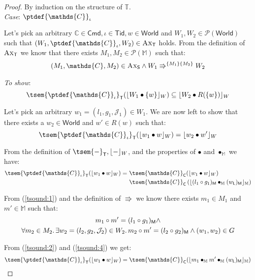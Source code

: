 {\parindent0pt
\begin{proof}
By induction on the structure of $\mathds{T}$. \\	

\textit{Case}: $\ptdef{\mathds{C}}_\iota$

Let's pick an arbitrary $\mathds{C} \in \mathsf{Cmd}, \iota \in \mathsf{Tid}, w \in \mathsf{World}$ and $W_1, W_2 \in \mathcal{P}(\mathsf{World})$ such that $(W_1, \ptdef{\mathds{C}}_\iota, W_2) \in \textsc{Ax}_\mathsf{T}$ holds. From the definition of $\textsc{Ax}_\mathsf{T}$ we know that there exists $M_1, M_2 \in \mathcal{P}(\mathbb{M})$ such that:
\begin{gather}\label{tsound:1}
	(M_1, \mathds{C}, M_2) \in \textsc{Ax}_\mathsf{S} \land W_1 \Rrightarrow^{\{M_1\}\{M_2\}} W_2
\end{gather}

\textit{To show}:
\[
	\tsem{\ptdef{\mathds{C}}_\iota}_\mathsf{T}(\lfloor W_1 \bullet \{w\} \rfloor_W) \subseteq \lfloor W_2 \bullet R(\{w\}) \rfloor_W
\]

Let's pick an arbitrary $w_1 = (l_1, g_1, \mathcal{J}_1) \in W_1$. We are now left to show that there exists a $w_2 \in \mathsf{World}$ and $w' \in R(w)$ such that:
\[
	\tsem{\ptdef{\mathds{C}}_\iota}_\mathsf{T}(\lfloor w_1 \bullet w \rfloor_W) = \lfloor w_2 \bullet w' \rfloor_W
\]

From the definition of $\tsem{-}_\mathsf{T}, \lfloor - \rfloor_W$, and the properties of $\bullet$ and $\bullet_\mathbb{M}$ we have:
\begin{align}\label{tsound:2}
\tsem{\ptdef{\mathds{C}}_\iota}_\mathsf{T}(\lfloor w_1 \bullet w \rfloor_W) =\
&\tsem{\mathds{C}}_\mathsf{C}(\lfloor w_1 \bullet w \rfloor_W) \\
&\tsem{\mathds{C}}_\mathsf{C}\left( \lfloor (l_1 \circ g_1)_\mathsf{M} \bullet_\mathbb{M} (w_\mathsf{L})_\mathsf{M} \rfloor_\mathbb{M} \right)
\end{align}

From (\ref{tsound:1}) and the definition of $\Rrightarrow$ we know there exists $m_1 \in M_1$ and $m' \in \mathbb{M}$ such that:
\begin{gather}
\label{tsound:3} m_1 \circ m' = (l_1 \circ g_1)_\mathsf{M} \land \\
\label{tsound:4} \forall m_2 \in M_2 \ldotp \exists w_2 = (l_2, g_2, \mathcal{J}_2) \in W_2 \ldotp m_2 \circ m' = (l_2 \circ g_2)_\mathsf{M} \land (w_1, w_2) \in G
\end{gather}

From (\ref{tsound:2}) and (\ref{tsound:4}) we get:
\begin{gather}\label{tsound:5}
\tsem{\ptdef{\mathds{C}}_\iota}_\mathsf{T}(\lfloor w_1 \bullet w \rfloor_W) =
\tsem{\mathds{C}}_\mathsf{C}(\lfloor m_1 \bullet_\mathbb{M} m' \bullet_\mathbb{M} (w_\mathsf{L})_\mathsf{M} \rfloor_\mathbb{M})
\end{gather}


\end{proof}}
